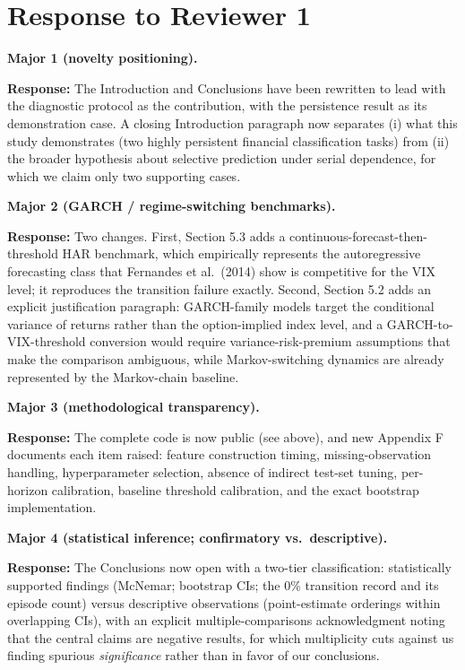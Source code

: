 \documentclass[11pt]{article}
\newcommand{\response}{\textbf{Response:} }
\begin{document}
\section*{Response to Reviewer 1}

\textbf{Major 1 (novelty positioning).}

\response The Introduction and Conclusions have been rewritten to lead with the diagnostic
protocol as the contribution, with the persistence result as its demonstration case. A closing
Introduction paragraph now separates (i) what this study demonstrates (two highly persistent
financial classification tasks) from (ii) the broader hypothesis about selective prediction
under serial dependence, for which we claim only two supporting cases.

\textbf{Major 2 (GARCH / regime-switching benchmarks).}

\response Two changes. First, Section 5.3 adds a continuous-forecast-then-threshold HAR
benchmark, which empirically represents the autoregressive forecasting class that Fernandes et
al.\ (2014) show is competitive for the VIX level; it reproduces the transition failure
exactly. Second, Section 5.2 adds an explicit justification paragraph: GARCH-family models
target the conditional variance of returns rather than the option-implied index level, and a
GARCH-to-VIX-threshold conversion would require variance-risk-premium assumptions that make
the comparison ambiguous, while Markov-switching dynamics are already represented by the
Markov-chain baseline.

\textbf{Major 3 (methodological transparency).}

\response The complete code is now public (see above), and new Appendix F documents each item
raised: feature construction timing, missing-observation handling, hyperparameter selection,
absence of indirect test-set tuning, per-horizon calibration, baseline threshold calibration,
and the exact bootstrap implementation.

\textbf{Major 4 (statistical inference; confirmatory vs.\ descriptive).}

\response The Conclusions now open with a two-tier classification: statistically supported
findings (McNemar; bootstrap CIs; the 0\% transition record and its episode count) versus
descriptive observations (point-estimate orderings within overlapping CIs), with an explicit
multiple-comparisons acknowledgment noting that the central claims are negative results, for
which multiplicity cuts against us finding spurious \emph{significance} rather than in favor
of our conclusions.
\end{document}
